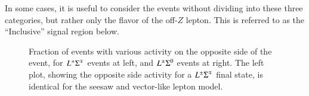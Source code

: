 In some cases, it is useful to consider the events without dividing into these three categories, but rather only the flavor of the off-$Z$ lepton. This is referred to as the ``Inclusive'' signal region below.

\begin{figure}
	\caption{Fraction of events with various activity on the opposite side of the event, for $L^{\pm}\Sigma^{\mp}$ events at left, and $L^{\pm}\Sigma^0$ events at right. The left plot, showing the opposite side activity for a $L^{\pm}\Sigma^{\mp}$ final state, is identical for the seesaw and vector-like lepton model.
	}
	\label{fig:opposite-side-br}
\end{figure}

